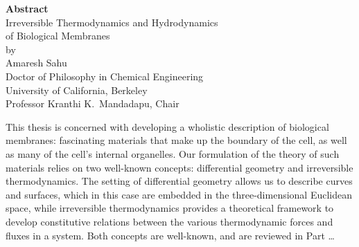 


\vspace*{0.5cm}
\begin{center}
	\textbf{\large Abstract}\\[34pt]
	Irreversible Thermodynamics and Hydrodynamics\\[3pt]
	of Biological Membranes\\[12pt]
	by\\[12pt]
	Amaresh Sahu\\[14pt]
	Doctor of Philosophy in Chemical Engineering\\[4pt]
	University of California, Berkeley\\[4pt]
	Professor Kranthi K.\ Mandadapu, Chair
\end{center}
\vspace{20pt}

This thesis is concerned with developing a wholistic description of biological membranes: fascinating materials that make up the boundary of the cell, as well as many of the cell's internal organelles.
Our formulation of the theory of such materials relies on two well-known concepts: differential geometry and irreversible thermodynamics.
The setting of differential geometry allows us to describe curves and surfaces, which in this case are embedded in the three-dimensional Euclidean space, while irreversible thermodynamics provides a theoretical framework to develop constitutive relations between the various thermodynamic forces and fluxes in a system.
Both concepts are well-known, and are reviewed in Part \ldots



